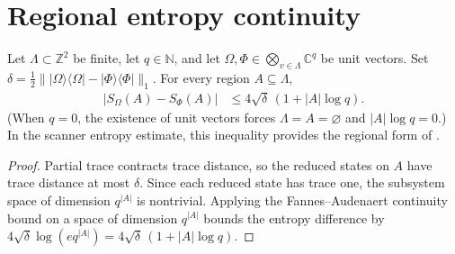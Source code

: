\section{Regional entropy continuity}

\begin{lemma}
    \label{thm:area_law_regional_entropy_continuity}
    \leanok
    Let $\Lambda\subset\mathbb Z^2$ be finite, let $q\in\mathbb N$, and let
    $\Omega,\Phi\in\bigotimes_{v\in\Lambda}\mathbb C^q$ be unit vectors.
    Set $\delta=\frac12\bigl\||\Omega\rangle\langle\Omega|
        -|\Phi\rangle\langle\Phi|\bigr\|_1$.
    For every region $A\subseteq\Lambda$,
    \begin{align*}
        |S_\Omega(A)-S_\Phi(A)| & \le 4\sqrt\delta\,(1+|A|\log q).
    \end{align*}
    (When $q=0$, the existence of unit vectors forces $\Lambda=A=\varnothing$
    and $|A|\log q=0$.)
    In the scanner entropy estimate, this inequality provides the regional
    form of \cite[Lemma~2.1]{OpenAI2026AreaLaw}.
\end{lemma}
\begin{proof}\leanok
    Partial trace contracts trace distance, so the reduced states on $A$ have
    trace distance at most $\delta$. Since each reduced state has trace one, the
    subsystem space of dimension $q^{|A|}$ is nontrivial. Applying the
    Fannes--Audenaert continuity bound on a space of dimension $q^{|A|}$ bounds
    the entropy difference by
    $4\sqrt\delta\log(e q^{|A|}) = 4\sqrt\delta\,(1+|A|\log q)$.
\end{proof}
